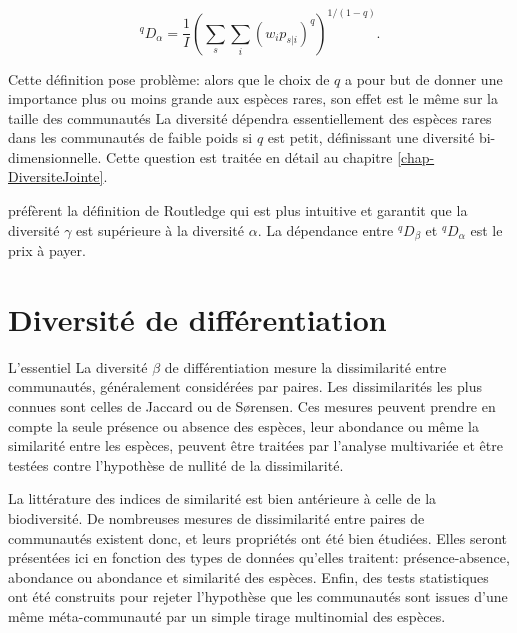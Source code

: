 \documentclass[
  11pt,
  french,
  a4paper,
  extrafontsizes,onecolumn,openright
  ]{memoir}
\newenvironment{Summary}
  {\begin{bclogo}[logo=\bctrombone, noborder=true, couleur=lightgray!50]{L'essentiel}\parindent0pt}
  {\end{bclogo}}
\begin{document}
\begin{equation}
  \label{eq:Chiualpha}
  ^{q}\!D_{\alpha}=\frac{1}{I}{\left(\sum_s{\sum_i{{\left(w_ip_{s|i}\right)}^q}}\right)}^{{1}/{\left(1-q\right)}}.
\end{equation}

Cette définition pose problème: alors que le choix de \(q\) a pour but de donner une importance plus ou moins grande aux espèces rares, son effet est le même sur la taille des communautés La diversité dépendra essentiellement des espèces rares dans les communautés de faible poids si \(q\) est petit, définissant une diversité bi-dimensionnelle.
Cette question est traitée en détail au chapitre \ref{chap-DiversiteJointe}.

\textcite{Marcon2014a} préfèrent la définition de Routledge qui est plus intuitive et garantit que la diversité \(\gamma\) est supérieure à la diversité \(\alpha\).
La dépendance entre \(^{q}\!D_{\beta}\) et \(^{q}\!D_{\alpha}\) est le prix à payer.

\hypertarget{chap-BetaPaires}{%
\chapter{Diversité de différentiation}\label{chap-BetaPaires}}

\scriptsize

\begin{Summary}
La diversité \(\beta\) de différentiation mesure la dissimilarité entre
communautés, généralement considérées par paires. Les dissimilarités les
plus connues sont celles de Jaccard ou de Sørensen. Ces mesures peuvent
prendre en compte la seule présence ou absence des espèces, leur
abondance ou même la similarité entre les espèces, peuvent être traitées
par l'analyse multivariée et être testées contre l'hypothèse de nullité
de la dissimilarité.
\end{Summary}

\normalsize

La littérature des indices de similarité est bien antérieure à celle de la biodiversité.
De nombreuses mesures de dissimilarité entre paires de communautés existent donc, et leurs propriétés ont été bien étudiées.
Elles seront présentées ici en fonction des types de données qu'elles traitent: présence-absence, abondance ou abondance et similarité des espèces.
Enfin, des tests statistiques ont été construits pour rejeter l'hypothèse que les communautés sont issues d'une même méta-communauté par un simple tirage multinomial des espèces.
\end{document}
